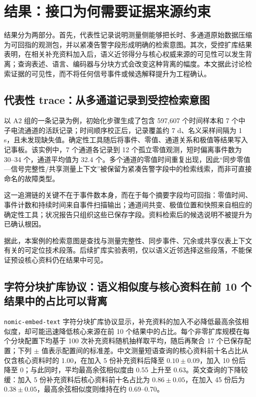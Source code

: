 \section{结果：接口为何需要证据来源约束}

结果分为两部分。首先，代表性记录说明测量侧能够把长时、多通道原始数据压缩为可回指的观测包，并以紧凑告警字段形成明确的检索意图。其次，受控扩库结果表明，在相关补充资料加入后，语义近邻得分与核心权威来源的可见性可以发生背离；查询表述、语言、编码器与分块方式会改变这种背离的幅度。本文据此讨论检索证据的可见性，而不将任何信号事件或候选解释提升为工程确认。

\subsection{代表性 trace：从多通道记录到受控检索意图}

以 A2 组的一条记录为例，初始化步骤生成了包含 597,607 个时间样本和 7 个中子电流通道的活跃记录；时间顺序校正后，记录覆盖约 7 d、名义采样间隔为 1 s，且未发现缺失值。确定性工具随后将事件、零值、通道关系和极值等结果写入记事板。该实例中，7 个通道各记录到 12 个孤立零值观测，短时偏离事件数为 30--34 个，通道平均值为 32.4 个。多个通道的零值时间重复出现，因此“同步零值—信号完整性/共享测量上下文”被保留为紧凑告警字段中的检索线索，而非可直接命名的故障类型。

这一追溯链的关键不在于事件数本身，而在于每个摘要字段均可回指：零值时间、事件计数和持续时间来自事件扫描输出；通道间共变、极值位置和快照来自相应的确定性工具；状况报告只组织这些已保存字段。资料检索后的候选说明不被提升为已确认根因。

据此，本案例的检索意图是查找与测量完整性、同步事件、冗余或共享仪表上下文有关的可定位技术段落。后续扩库实验表明，仅以语义近邻选择这些段落，不能保证预设核心资料仍在结果中可见。


\subsection{字符分块扩库协议：语义相似度与核心资料在前 10 个结果中的占比可以背离}

\texttt{nomic-embed-text} 字符分块扩库协议显示，补充资料的加入不必降低最高余弦相似度，却可能迅速降低核心来源在前 10 个结果中的占比。每个非零扩库规模在每个分块配置下均基于 100 次补充资料随机抽样取平均，随后再聚合 17 个已保存配置；下列 $\pm$ 值表示配置间的标准差。中文测量短语查询的核心资料前十名占比从仅含核心资料时的 1.00，在加入 5 份补充资料后降至 $0.10\pm0.09$，加入 10 份后降至 0；与此同时，平均最高余弦相似度由 0.55 上升至 0.63。英文查询的下降较缓：加入 5 份补充资料后核心资料前十名占比为 $0.86\pm0.05$，在加入 45 份后为 $0.38\pm0.05$，最高余弦相似度则维持在约 0.69--0.70。

